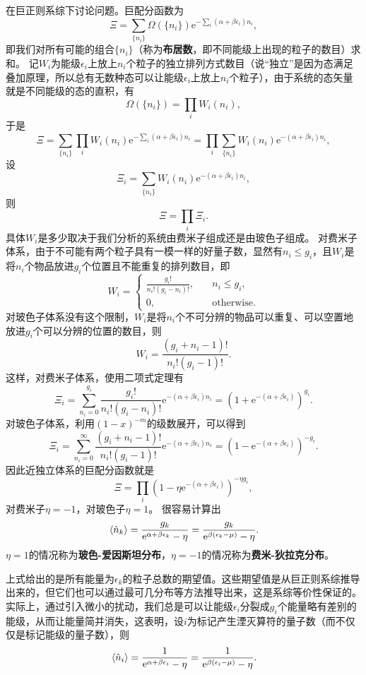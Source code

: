 \documentclass[hyperref, UTF8, a4paper]{ctexart}
\newcommand*{\ee}{\mathrm{e}}
\begin{document}
在巨正则系综下讨论问题。巨配分函数为
\[
    \Xi = \sum_{\{n_i\}} \Omega(\{n_i\}) \ee^{- \sum_i (\alpha + \beta \epsilon_i) n_i},
\]
即我们对所有可能的组合$\{n_i\}$（称为\textbf{布居数}，即不同能级上出现的粒子的数目）求和。
记$W_i$为能级$\epsilon_i$上放上$n_i$个粒子的独立排列方式数目（说“独立”是因为态满足叠加原理，所以总有无数种态可以让能级$\epsilon_i$上放上$n_i$个粒子），由于系统的态矢量就是不同能级的态的直积，有
\[
    \Omega(\{n_i\}) = \prod_i W_i(n_i),
\]
于是
\[
    \Xi = \sum_{\{n_i\}} \prod_i W_i(n_i) \ee^{- \sum_i (\alpha + \beta \epsilon_i) n_i} = \prod_i \sum_{\{n_i\}} W_i(n_i) \ee^{-  (\alpha + \beta \epsilon_i) n_i},
\]
设
\[
    \Xi_i = \sum_{\{n_i\}} W_i(n_i) \ee^{-  (\alpha + \beta \epsilon_i) n_i},
\]
则
\[
    \Xi = \prod_i \Xi_i.
\]
具体$W_i$是多少取决于我们分析的系统由费米子组成还是由玻色子组成。
对费米子体系，由于不可能有两个粒子具有一模一样的好量子数，显然有$n_i \leq g_i$，且$W_i$是将$n_i$个物品放进$g_i$个位置且不能重复的排列数目，即
\[
    W_i = \begin{cases}
        \frac{g_i !}{n_i ! (g_i - n_i) !}, &\quad n_i \leq g_i, \\
        0, &\quad \text{otherwise}.
    \end{cases}
\]
对玻色子体系没有这个限制，$W_i$是将$n_i$个不可分辨的物品可以重复、可以空置地放进$g_i$个可以分辨的位置的数目，则
\[
    W_i = \frac{(g_i + n_i - 1) !}{n_i ! (g_i - 1)!}.
\]
这样，对费米子体系，使用二项式定理有
\[
    \Xi_i = \sum_{n_i=0}^{g_i} \frac{g_i !}{n_i ! (g_i - n_i) !} \ee^{- (\alpha + \beta \epsilon_i) n_i} = \left( 1 + \ee^{- (\alpha + \beta \epsilon_i) } \right)^{g_i}.
\]
对玻色子体系，利用$(1-x)^{-m}$的级数展开，可以得到
\[
    \Xi_i = \sum_{n_i=0}^\infty \frac{(g_i + n_i - 1) !}{n_i ! (g_i - 1)!} \ee^{- (\alpha + \beta \epsilon_i) n_i} = (1 - \ee^{- (\alpha + \beta \epsilon_i)})^{-g_i}.
\]
因此近独立体系的巨配分函数就是
\begin{equation}
    \Xi = \prod_i (1 - \eta \ee^{- (\alpha + \beta \epsilon_i)})^{-\eta g_i},
    \label{eq:grand-partition-independent}
\end{equation}
对费米子$\eta=-1$，对玻色子$\eta=1$。
很容易计算出
\begin{equation}
    \expval*{\hat{n}_k} = \frac{g_k}{\ee^{\alpha + \beta \epsilon_k} - \eta} = \frac{g_k}{\ee^{\beta (\epsilon_k - \mu)} - \eta}.
\end{equation}
$\eta=1$的情况称为\textbf{玻色-爱因斯坦分布}，$\eta=-1$的情况称为\textbf{费米-狄拉克分布}。

上式给出的是所有能量为$\epsilon_k$的粒子总数的期望值。这些期望值是从巨正则系综推导出来的，但它们也可以通过最可几分布等方法推导出来，这是系综等价性保证的。
实际上，通过引入微小的扰动，我们总是可以让能级$\epsilon_i$分裂成$g_i$个能量略有差别的能级，从而让能量简并消失，这表明，设$i$为标记产生湮灭算符的量子数（而不仅仅是标记能级的量子数），则
\begin{equation}
    \expval*{\hat{n}_i} = \frac{1}{\ee^{ \alpha + \beta \epsilon_i} - \eta } = \frac{1}{\ee^{\beta (\epsilon_i - \mu)} - \eta }.
\end{equation}
\end{document}
